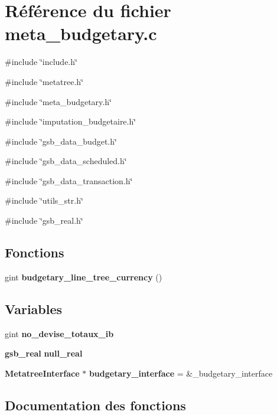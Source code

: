 \section{Référence du fichier meta\_\-budgetary.c}
\label{meta__budgetary_8c}
{\ttfamily \#include \char`\"{}include.h\char`\"{}}\par
{\ttfamily \#include \char`\"{}metatree.h\char`\"{}}\par
{\ttfamily \#include \char`\"{}meta\_\-budgetary.h\char`\"{}}\par
{\ttfamily \#include \char`\"{}imputation\_\-budgetaire.h\char`\"{}}\par
{\ttfamily \#include \char`\"{}gsb\_\-data\_\-budget.h\char`\"{}}\par
{\ttfamily \#include \char`\"{}gsb\_\-data\_\-scheduled.h\char`\"{}}\par
{\ttfamily \#include \char`\"{}gsb\_\-data\_\-transaction.h\char`\"{}}\par
{\ttfamily \#include \char`\"{}utils\_\-str.h\char`\"{}}\par
{\ttfamily \#include \char`\"{}gsb\_\-real.h\char`\"{}}\par
\subsection*{Fonctions}
\begin{DoxyCompactItemize}
\item 
gint {\bf budgetary\_\-line\_\-tree\_\-currency} ()
\end{DoxyCompactItemize}
\subsection*{Variables}
\begin{DoxyCompactItemize}
\item 
gint {\bf no\_\-devise\_\-totaux\_\-ib}
\item 
{\bf gsb\_\-real} {\bf null\_\-real}
\item 
{\bf MetatreeInterface} $\ast$ {\bf budgetary\_\-interface} = \&\_\-budgetary\_\-interface
\end{DoxyCompactItemize}


\subsection{Documentation des fonctions}
